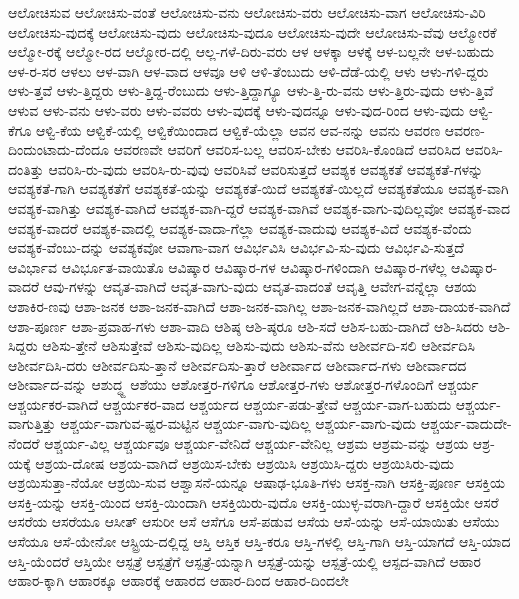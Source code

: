 {ಆಲೋಚಿಸುವ
ಆಲೋಚಿಸು-ವಂತೆ
ಆಲೋಚಿಸು-ವನು
ಆಲೋಚಿಸು-ವರು
ಆಲೋಚಿಸು-ವಾಗ
ಆಲೋಚಿಸು-ವಿರಿ
ಆಲೋಚಿಸು-ವುದಕ್ಕೆ
ಆಲೋಚಿಸು-ವುದು
ಆಲೋಚಿಸು-ವುದೂ
ಆಲೋಚಿಸು-ವುದೇ
ಆಲೋಚಿಸು-ವೆವು
ಆಲ್ಮೋರಕೆ
ಆಲ್ಮೋ-ರಕ್ಕೆ
ಆಲ್ಮೋ-ರದ
ಆಲ್ಮೋರ-ದಲ್ಲಿ
ಆಲ್ಲ-ಗಳೆ-ದಿರು-ವರು
ಆಳ
ಆಳಕ್ಕಾ
ಆಳಕ್ಕೆ
ಆಳ-ಬಲ್ಲನೇ
ಆಳ-ಬಹುದು
ಆಳ-ರ-ಸರ
ಆಳಲು
ಆಳ-ವಾಗಿ
ಆಳ-ವಾದ
ಆಳವೂ
ಆಳಿ
ಆಳಿ-ತೆಂಬುದು
ಆಳಿ-ದೆಡೆ-ಯಲ್ಲಿ
ಆಳು
ಆಳು-ಗಳಿ-ದ್ದರು
ಆಳು-ತ್ತವೆ
ಆಳು-ತ್ತಿದ್ದರು
ಆಳು-ತ್ತಿದ್ದ-ರೆಂಬುದು
ಆಳು-ತ್ತಿದ್ದಾಗ್ಯೂ
ಆಳು-ತ್ತಿ-ರು-ವನು
ಆಳು-ತ್ತಿರು-ವುದು
ಆಳು-ತ್ತಿವೆ
ಆಳುವ
ಆಳು-ವನು
ಆಳು-ವರು
ಆಳು-ವವರು
ಆಳು-ವುದಕ್ಕೆ
ಆಳು-ವುದನ್ನೂ
ಆಳು-ವುದ-ರಿಂದ
ಆಳು-ವುದು
ಆಳ್ವಿ-ಕೆಗೂ
ಆಳ್ವಿ-ಕೆಯ
ಆಳ್ವಿಕೆ-ಯಲ್ಲಿ
ಆಳ್ವಿಕೆಯಿಂದಾದ
ಆಳ್ವಿಕೆ-ಯೆಲ್ಲಾ
ಆವನ
ಆವ-ನನ್ನು
ಆವನು
ಆವರಣ
ಆವರಣ-ದಿಂದುಂಟಾದು-ದೆಂದೂ
ಆವರಣವೇ
ಆವರಿಗೆ
ಆವರಿಸ-ಬಲ್ಲ
ಆವರಿಸ-ಬೇಕು
ಆವರಿಸಿ-ಕೊಂಡಿದೆ
ಆವರಿಸಿದ
ಆವರಿಸಿ-ದಂತಿತ್ತು
ಆವರಿಸಿ-ರು-ವುದು
ಆವರಿಸಿ-ರು-ವುವು
ಆವರಿಸಿವೆ
ಆವರಿಸುತ್ತದೆ
ಆವಶ್ಯಕ
ಆವಶ್ಯಕತೆ
ಆವಶ್ಯಕತೆ-ಗಳನ್ನು
ಆವಶ್ಯಕತೆ-ಗಾಗಿ
ಆವಶ್ಯಕತೆಗೆ
ಆವಶ್ಯಕತೆ-ಯನ್ನು
ಆವಶ್ಯಕತೆ-ಯಿದೆ
ಆವಶ್ಯಕತೆ-ಯಿಲ್ಲದೆ
ಆವಶ್ಯಕತೆಯೂ
ಆವಶ್ಯಕ-ವಾಗಿ
ಆವಶ್ಯಕ-ವಾಗಿತ್ತು
ಆವಶ್ಯಕ-ವಾಗಿದೆ
ಆವಶ್ಯಕ-ವಾಗಿ-ದ್ದರೆ
ಆವಶ್ಯಕ-ವಾಗಿವೆ
ಆವಶ್ಯಕ-ವಾಗು-ವುದಿಲ್ಲವೋ
ಆವಶ್ಯಕ-ವಾದ
ಆವಶ್ಯಕ-ವಾದರೆ
ಆವಶ್ಯಕ-ವಾದಲ್ಲಿ
ಆವಶ್ಯಕ-ವಾದಾ-ಗೆಲ್ಲಾ
ಆವಶ್ಯಕ-ವಾದುವು
ಆವಶ್ಯಕ-ವಿದೆ
ಆವಶ್ಯಕ-ವೆಂದು
ಆವಶ್ಯಕ-ವೆಂಬು-ದನ್ನು
ಆವಶ್ಯಕವೋ
ಆವಾಗಾ-ವಾಗ
ಆವಿರ್ಭವಿಸಿ
ಆವಿರ್ಭವಿ-ಸು-ವುದು
ಆವಿರ್ಭವಿ-ಸುತ್ತದೆ
ಆವಿರ್ಭಾವ
ಆವಿರ್ಭೂತ-ವಾಯಿತೊ
ಆವಿಷ್ಕಾರ
ಆವಿಷ್ಕಾರ-ಗಳ
ಆವಿಷ್ಕಾರ-ಗಳಿಂದಾಗಿ
ಆವಿಷ್ಕಾರ-ಗಳೆಲ್ಲ
ಆವಿಷ್ಕಾರ-ವಾದರೆ
ಆವು-ಗಳನ್ನು
ಆವೃತ-ವಾಗಿದೆ
ಆವೃತ-ವಾಗು-ವುದು
ಆವೃತ-ವಾದಂತೆ
ಆವೃತ್ತಿ
ಆವೇಗ-ವನ್ನೆಲ್ಲಾ
ಆಶಯ
ಆಶಾಕಿರ-ಣವು
ಆಶಾ-ಜನಕ
ಆಶಾ-ಜನಕ-ವಾಗಿದೆ
ಆಶಾ-ಜನಕ-ವಾಗಿಲ್ಲ
ಆಶಾ-ಜನಕ-ವಾಗಿಲ್ಲದೆ
ಆಶಾ-ದಾಯಕ-ವಾಗಿದೆ
ಆಶಾ-ಪೂರ್ಣ
ಆಶಾ-ಪ್ರವಾಹ-ಗಳು
ಆಶಾ-ವಾದಿ
ಆಶಿಷ್ಠ
ಆಶಿ-ಷ್ಠರೂ
ಆಶಿ-ಸದೆ
ಆಶಿಸ-ಬಹು-ದಾಗಿದೆ
ಆಶಿ-ಸಿದರು
ಆಶಿ-ಸಿದ್ದರು
ಆಶಿಸು-ತ್ತೇನೆ
ಆಶಿಸುತ್ತೇವೆ
ಆಶಿಸು-ವುದಿಲ್ಲ
ಆಶಿಸು-ವುದು
ಆಶಿಸು-ವೆನು
ಆಶೀರ್ವದಿ-ಸಲಿ
ಆಶೀರ್ವದಿಸಿ
ಆಶೀರ್ವದಿಸಿ-ದರು
ಆಶೀರ್ವದಿಸು-ತ್ತಾನೆ
ಆಶೀರ್ವದಿಸು-ತ್ತಾರೆ
ಆಶೀರ್ವಾದ
ಆಶೀರ್ವಾದ-ಗಳು
ಆಶೀರ್ವಾದದ
ಆಶೀರ್ವಾದ-ವನ್ನು
ಆಶುದ್ಧ್ದ
ಆಶೆಯು
ಆಶೋತ್ತರ-ಗಳಿಗೂ
ಆಶೋತ್ತರ-ಗಳು
ಆಶೋತ್ತರ-ಗಳೊಂದಿಗೆ
ಆಶ್ಚರ್ಯ
ಆಶ್ಚರ್ಯಕರ-ವಾಗಿದೆ
ಆಶ್ಚರ್ಯಕರ-ವಾದ
ಆಶ್ಚರ್ಯದ
ಆಶ್ಚರ್ಯ-ಪಡು-ತ್ತೇವೆ
ಆಶ್ಚರ್ಯ-ವಾಗ-ಬಹುದು
ಆಶ್ಚರ್ಯ-ವಾಗುತ್ತಿತ್ತು
ಆಶ್ಚರ್ಯ-ವಾಗುವ-ಷ್ಟರ-ಮಟ್ಟಿನ
ಆಶ್ಚರ್ಯ-ವಾಗು-ವುದಿಲ್ಲ
ಆಶ್ಚರ್ಯ-ವಾಗು-ವುದು
ಆಶ್ಚರ್ಯ-ವಾದುದೇ-ನೆಂದರೆ
ಆಶ್ಚರ್ಯ-ವಿಲ್ಲ
ಆಶ್ಚರ್ಯವೂ
ಆಶ್ಚರ್ಯ-ವೇನಿದೆ
ಆಶ್ಚರ್ಯ-ವೇನಿಲ್ಲ
ಆಶ್ರಮ
ಆಶ್ರಮ-ವನ್ನು
ಆಶ್ರಯ
ಆಶ್ರ-ಯಕ್ಕೆ
ಆಶ್ರಯ-ದೋಷ
ಆಶ್ರಯ-ವಾಗಿದೆ
ಆಶ್ರಯಿಸ-ಬೇಕು
ಆಶ್ರಯಿಸಿ
ಆಶ್ರಯಿಸಿ-ದ್ದರು
ಆಶ್ರಯಿಸಿರು-ವುದು
ಆಶ್ರಯಿಸುತ್ತಾ-ನೆಯೋ
ಆಶ್ರಯಿ-ಸುವ
ಆಶ್ವಾಸನೆ-ಯನ್ನೂ
ಆಷಾಢ-ಭೂತಿ-ಗಳು
ಆಸಕ್ತ-ನಾಗಿ
ಆಸಕ್ತಿ-ಪೂರ್ಣ
ಆಸಕ್ತಿಯ
ಆಸಕ್ತಿ-ಯನ್ನು
ಆಸಕ್ತಿ-ಯಿಂದ
ಆಸಕ್ತಿ-ಯಿಂದಾಗಿ
ಆಸಕ್ತಿಯಿರು-ವುದೊ
ಆಸಕ್ತಿ-ಯುಳ್ಳ-ವರಾಗಿ-ದ್ದಾರೆ
ಆಸಕ್ತಿಯೇ
ಆಸರೆ
ಆಸರೆಯ
ಆಸರೆಯೂ
ಆಸೀತ್
ಆಸುರೀ
ಆಸೆ
ಆಸೆಗೂ
ಆಸೆ-ಪಡುವ
ಆಸೆಯ
ಆಸೆ-ಯನ್ನು
ಆಸೆ-ಯಾಯಿತು
ಆಸೆಯು
ಆಸೆಯೂ
ಆಸೆ-ಯೇನೋ
ಆಸ್ಟ್ರಿಯ-ದಲ್ಲಿದ್ದ
ಆಸ್ತಿ
ಆಸ್ತಿಕ
ಆಸ್ತಿ-ಕರೂ
ಆಸ್ತಿ-ಗಳಲ್ಲಿ
ಆಸ್ತಿ-ಗಾಗಿ
ಆಸ್ತಿ-ಯಾಗದೆ
ಆಸ್ತಿ-ಯಾದ
ಆಸ್ತಿ-ಯೆಂದರೆ
ಆಸ್ತಿಯೇ
ಆಸ್ಪತ್ರೆ
ಆಸ್ಪತ್ರೆಗೆ
ಆಸ್ಪತ್ರೆ-ಯನ್ನಾಗಿ
ಆಸ್ಪತ್ರೆ-ಯನ್ನು
ಆಸ್ಪತ್ರೆ-ಯಲ್ಲಿ
ಆಸ್ಪದ-ವಾಗಿದೆ
ಆಹಾರ
ಆಹಾರ-ಕ್ಕಾಗಿ
ಆಹಾರಕ್ಕೂ
ಆಹಾರಕ್ಕೆ
ಆಹಾರದ
ಆಹಾರ-ದಿಂದ
ಆಹಾರ-ದಿಂದಲೇ
}
